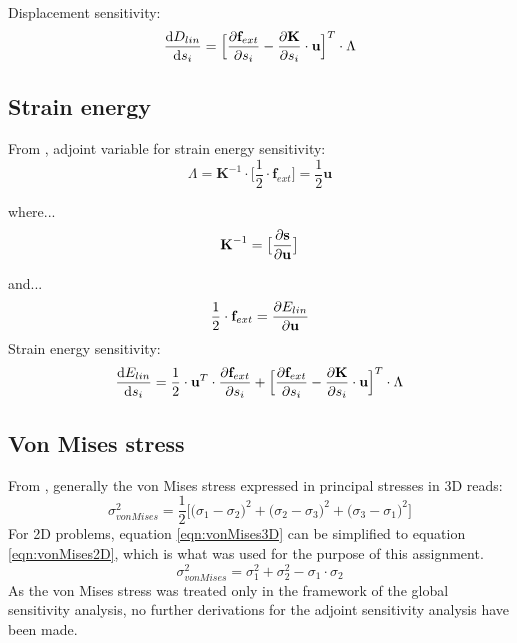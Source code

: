 Displacement sensitivity: 
\begin{equation}
\dv{D_{lin}}{s_i} = \Big[\pdv{\textbf{f}_{ext}}{s_i} - \pdv{\textbf{K}}{s_i} \cdot\textbf{u}\Big]^T \cdot \Lambda
\label{}
\end{equation}

\subsection{Strain energy}

From \cite{masching_dissertation}, adjoint variable for strain energy sensitivity:
\begin{equation}
\Lambda = \textbf{K}^{-1} \cdot \Big[\frac{1}{2}\cdot\textbf{f}_{ext} \Big] = \frac{1}{2}\textbf{u}
\end{equation}

where...
\begin{equation}
    \textbf{K}^{-1} = \big[ \pdv{\textbf{s}}{\textbf{u}}\big]
\end{equation}

and...
\begin{equation}
    \frac{1}{2}\cdot\textbf{f}_{ext} = \pdv{E_{lin}}{\textbf{u}}
\end{equation}
Strain energy sensitivity:
\begin{equation}
\dv{E_{lin}}{s_i} = \frac{1}{2}\cdot\textbf{u}^T\cdot\pdv{\textbf{f}_{ext}}{s_i}+\Big[\pdv{\textbf{f}_{ext}}{s_i} - \pdv{\textbf{K}}{s_i} \cdot\textbf{u}\Big]^T \cdot \Lambda
\label{}
\end{equation}
\subsection{Von Mises stress}
From \cite{vonMises}, generally the von Mises stress expressed in principal stresses in 3D reads: 
\begin{equation} \label{eqn:vonMises3D}
\sigma^2_{von Mises}=\frac{1}{2}\big [\big(\sigma_{1}-\sigma_{2}\big )^2+\big(\sigma_{2}-\sigma_{3}\big )^2+\big(\sigma_{3}-\sigma_{1}\big )^2\big]
\end{equation}
For 2D problems, equation \ref{eqn:vonMises3D} can be simplified to equation \ref{eqn:vonMises2D}, which is what was used for the purpose of this assignment.
\begin{equation} \label{eqn:vonMises2D}
\sigma^2_{von Mises}=\sigma_{1}^2+\sigma_{2}^2-\sigma_{1}\cdot\sigma_{2}
\end{equation}
As the von Mises stress was treated only in the framework of the global sensitivity analysis, no further derivations for the adjoint sensitivity analysis have been made.